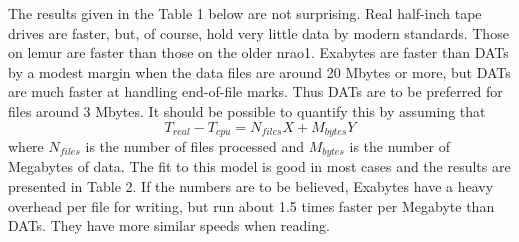 The results given in the Table 1 below are not surprising.  Real
half-inch tape drives are faster, but, of course, hold very little
data by modern standards.  Those on lemur are faster than those on the
older nrao1.  Exabytes are faster than DATs by a modest margin when
the data files are around 20 Mbytes or more, but DATs are much faster
at handling end-of-file marks.  Thus DATs are to be preferred for
files around 3 Mbytes.  It should be possible to quantify this by
assuming that
$$T_{real} - T_{cpu} = N_{files} X + M_{bytes} Y$$
where $N_{files}$ is the number of files processed and $M_{bytes}$ is
the number of Megabytes of data.  The fit to this model is good in
most cases and the results are presented in Table 2.  If the numbers
are to be believed, Exabytes have a heavy overhead per file for
writing, but run about 1.5 times faster per Megabyte than DATs.  They
have more similar speeds when reading.

